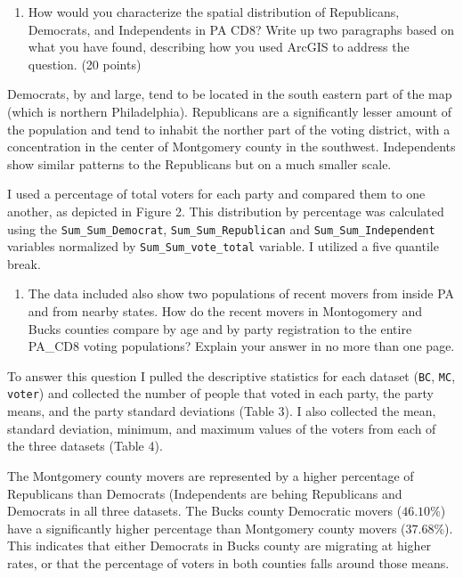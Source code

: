 \documentclass[]{article}
\providecommand{\tightlist}{%
  \setlength{\itemsep}{0pt}\setlength{\parskip}{0pt}}
\begin{document}
\begin{enumerate}
\def\labelenumi{\arabic{enumi}.}
\setcounter{enumi}{1}
\tightlist
\item
  How would you characterize the spatial distribution of Republicans,
  Democrats, and Independents in PA CD8? Write up two paragraphs based
  on what you have found, describing how you used ArcGIS to address the
  question. (20 points)
\end{enumerate}

Democrats, by and large, tend to be located in the south eastern part of
the map (which is northern Philadelphia). Republicans are a
significantly lesser amount of the population and tend to inhabit the
norther part of the voting district, with a concentration in the center
of Montgomery county in the southwest. Independents show similar
patterns to the Republicans but on a much smaller scale.

I used a percentage of total voters for each party and compared them to
one another, as depicted in Figure 2. This distribution by percentage
was calculated using the \texttt{Sum\_Sum\_Democrat},
\texttt{Sum\_Sum\_Republican} and \texttt{Sum\_Sum\_Independent}
variables normalized by \texttt{Sum\_Sum\_vote\_total} variable. I
utilized a five quantile break.

\begin{enumerate}
\def\labelenumi{\arabic{enumi}.}
\setcounter{enumi}{2}
\tightlist
\item
  The data included also show two populations of recent movers from
  inside PA and from nearby states. How do the recent movers in
  Montogomery and Bucks counties compare by age and by party
  registration to the entire PA\_CD8 voting populations? Explain your
  answer in no more than one page.
\end{enumerate}

To answer this question I pulled the descriptive statistics for each
dataset (\texttt{BC}, \texttt{MC}, \texttt{voter}) and collected the
number of people that voted in each party, the party means, and the
party standard deviations (Table 3). I also collected the mean, standard
deviation, minimum, and maximum values of the voters from each of the
three datasets (Table 4).

The Montgomery county movers are represented by a higher percentage of
Republicans than Democrats (Independents are behing Republicans and
Democrats in all three datasets. The Bucks county Democratic movers
(\(46.10\%\)) have a significantly higher percentage than Montgomery
county movers (\(37.68\%\)). This indicates that either Democrats in
Bucks county are migrating at higher rates, or that the percentage of
voters in both counties falls around those means.
\end{document}
